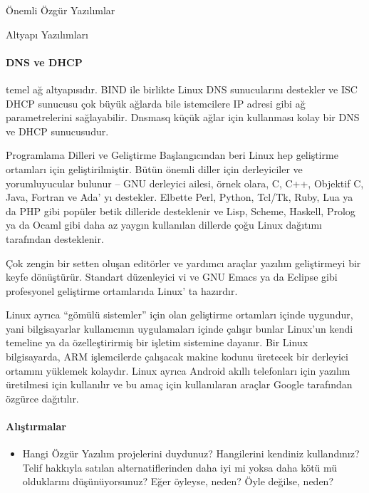 \begin{section}{Önemli Özgür Yazılımlar}
\begin{subsection}{Altyapı Yazılımları}
\paragraph{DNS ve DHCP}{temel ağ altyapısıdır. BIND ile birlikte Linux DNS sunucularını destekler ve ISC DHCP sunucusu çok büyük ağlarda bile istemcilere IP adresi gibi ağ parametrelerini sağlayabilir. Dnsmasq küçük ağlar için kullanması kolay bir DNS ve DHCP sunucusudur.}
\end{subsection}
\begin{subsection}{Programlama Dilleri ve Geliştirme}
Başlangıcından beri Linux hep geliştirme ortamları için geliştirilmiştir. Bütün önemli diller için derleyiciler ve yorumluyucular bulunur – GNU derleyici ailesi, örnek olara, C, C++, Objektif C, Java, Fortran ve Ada' yı destekler. Elbette Perl, Python, Tcl/Tk, Ruby, Lua ya da PHP gibi popüler betik dilleride desteklenir ve Lisp, Scheme, Haskell, Prolog ya da Ocaml gibi daha az yaygın kullanılan dillerde çoğu Linux dağıtımı tarafından desteklenir.

Çok zengin bir setten oluşan editörler ve yardımcı araçlar yazılım geliştirmeyi bir keyfe dönüştürür. Standart düzenleyici vi ve GNU Emacs ya da Eclipse gibi profesyonel geliştirme ortamlarıda Linux' ta hazırdır.

Linux ayrıca “gömülü sistemler” için olan geliştirme ortamları içinde uygundur, yani bilgisayarlar kullanıcının uygulamaları içinde çalışır bunlar Linux'un kendi temeline ya da özelleştirirmiş bir işletim sistemine dayanır. Bir Linux bilgisayarda, ARM işlemcilerde çalışacak makine kodunu üretecek bir derleyici ortamını yüklemek kolaydır. Linux ayrıca Android akıllı telefonları için yazılım üretilmesi için kullanılır ve bu amaç için kullanılaran araçlar Google tarafından özgürce dağıtılır.
\end{subsection}
\paragraph{Alıştırmalar}{
\begin{itemize}
 \item Hangi Özgür Yazılım projelerini duydunuz? Hangilerini kendiniz kullandınız? Telif hakkıyla satılan alternatiflerinden daha iyi mi yoksa daha kötü mü olduklarını düşünüyorsunuz? Eğer öyleyse, neden? Öyle değilse, neden?
\end{itemize}}
\end{section}
